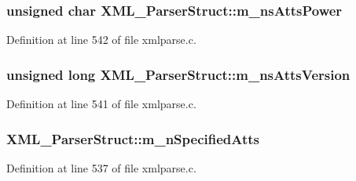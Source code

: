 \subsubsection[{\texorpdfstring{m\+\_\+ns\+Atts\+Power}{m_nsAttsPower}}]{\setlength{\rightskip}{0pt plus 5cm}unsigned char X\+M\+L\+\_\+\+Parser\+Struct\+::m\+\_\+ns\+Atts\+Power}\hypertarget{struct_x_m_l___parser_struct_a25f67e646832c943c9f7a96246fd3bc8}{}\label{struct_x_m_l___parser_struct_a25f67e646832c943c9f7a96246fd3bc8}


Definition at line 542 of file xmlparse.\+c.

\subsubsection[{\texorpdfstring{m\+\_\+ns\+Atts\+Version}{m_nsAttsVersion}}]{\setlength{\rightskip}{0pt plus 5cm}unsigned long X\+M\+L\+\_\+\+Parser\+Struct\+::m\+\_\+ns\+Atts\+Version}\hypertarget{struct_x_m_l___parser_struct_aee52b0f2c4992d22d87fefe7b2c6c278}{}\label{struct_x_m_l___parser_struct_aee52b0f2c4992d22d87fefe7b2c6c278}


Definition at line 541 of file xmlparse.\+c.

\subsubsection[{\texorpdfstring{m\+\_\+n\+Specified\+Atts}{m_nSpecifiedAtts}}]{ X\+M\+L\+\_\+\+Parser\+Struct\+::m\+\_\+n\+Specified\+Atts}\hypertarget{struct_x_m_l___parser_struct_a1876d470ce4ac4b575cc57bd6f90dea9}{}\label{struct_x_m_l___parser_struct_a1876d470ce4ac4b575cc57bd6f90dea9}


Definition at line 537 of file xmlparse.\+c.

